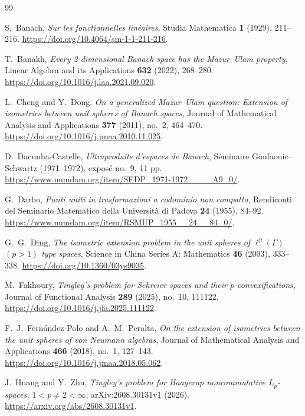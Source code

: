 \begin{thebibliography}{99}

S.~Banach,
\emph{Sur les fonctionnelles lin\'eaires},
Studia Mathematica \textbf{1} (1929), 211--216.
\url{https://doi.org/10.4064/sm-1-1-211-216}.

T.~Banakh,
\emph{Every 2-dimensional Banach space has the Mazur--Ulam property},
Linear Algebra and its Applications \textbf{632} (2022), 268--280.
\url{https://doi.org/10.1016/j.laa.2021.09.020}.

L.~Cheng and Y.~Dong,
\emph{On a generalized Mazur--Ulam question: Extension of isometries between unit spheres of Banach spaces},
Journal of Mathematical Analysis and Applications \textbf{377} (2011), no.~2, 464--470.
\url{https://doi.org/10.1016/j.jmaa.2010.11.025}.

D.~Dacunha-Castelle,
\emph{Ultraproduits d'espaces de Banach},
S\'eminaire Goulaouic--Schwartz (1971--1972), expos\'e no.~9, 11 pp.
\url{https://www.numdam.org/item/SEDP_1971-1972____A9_0/}.

G.~Darbo,
\emph{Punti uniti in trasformazioni a codominio non compatto},
Rendiconti del Seminario Matematico della Universit\`a di Padova
\textbf{24} (1955), 84--92.
\url{https://www.numdam.org/item/RSMUP_1955__24__84_0/}.

G.~G.~Ding,
\emph{The isometric extension problem in the unit spheres of $\ell^p(\Gamma)$ $(p>1)$ type spaces},
Science in China Series A: Mathematics \textbf{46} (2003), 333--338.
\url{https://doi.org/10.1360/03ys9035}.

M.~Fakhoury,
\emph{Tingley's problem for Schreier spaces and their $p$-convexifications},
Journal of Functional Analysis \textbf{289} (2025), no.~10, 111122.
\url{https://doi.org/10.1016/j.jfa.2025.111122}.

F.~J.~Fern\'andez-Polo and A.~M.~Peralta,
\emph{On the extension of isometries between the unit spheres of von Neumann algebras},
Journal of Mathematical Analysis and Applications \textbf{466} (2018), no.~1, 127--143.
\url{https://doi.org/10.1016/j.jmaa.2018.05.062}.

J.~Huang and Y.~Zhu,
\emph{Tingley's problem for Haagerup noncommutative $L_p$-spaces, $1<p\ne2<\infty$},
arXiv:2608.30131v1 (2026).
\url{https://arxiv.org/abs/2608.30131v1}.


\end{thebibliography}
